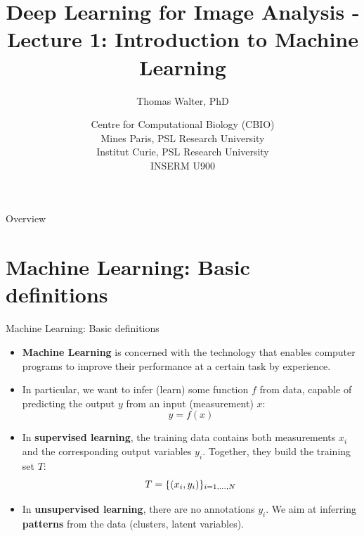 \documentclass[xcolor=pdftex,dvipsnames,table]{beamer}
\title{Deep Learning for Image Analysis - \\
	   Lecture 1: Introduction to Machine Learning}
\author{Thomas Walter, PhD}
\date{Centre for Computational Biology (CBIO) \\
	  Mines Paris, PSL Research University \\
	  Institut Curie, PSL Research University \\
	  INSERM U900}
\begin{document}
\begin{frame}
\titlepage
\end{frame}

\begin{frame}{Overview}
\tableofcontents
\end{frame}

\section{Machine Learning: Basic definitions}

\begin{frame}{Machine Learning: Basic definitions}
\begin{itemize}
    \item \textbf{Machine Learning} is concerned with the technology that enables computer programs to improve their performance at a certain task by experience.
	\item In particular, we want to infer (learn) some function $f$ from data, capable of predicting the output $y$ from an input (measurement) $x$:
	\begin{equation*}
	y = f(x)
	\end{equation*}
      	\item In \textbf{supervised learning}, the training data contains both measurements $x_i$ and the corresponding output variables $y_i$. Together, they build the training set $T$:
	\begin{equation*}
	T = \{(x_i, y_i)\}_{i=1, \ldots, N}
	\end{equation*}
	\item In \textbf{unsupervised learning}, there are no annotations $y_i$. We aim at inferring \textbf{patterns} from the data (clusters, latent variables).
\end{itemize}
\end{frame}
\end{document}
